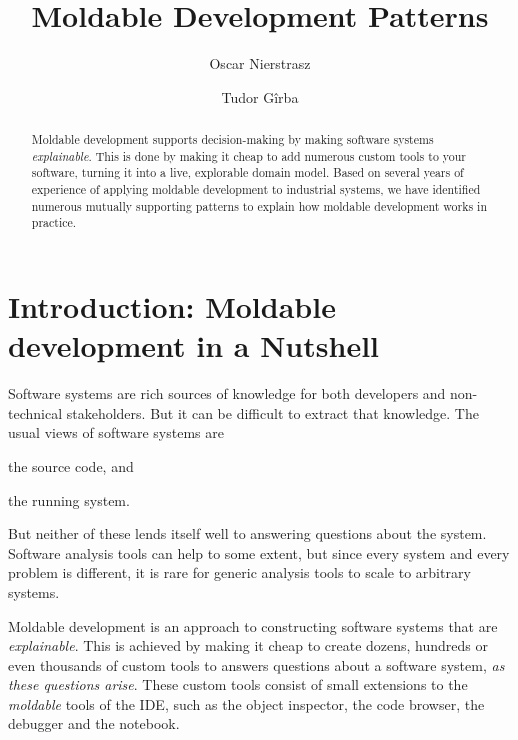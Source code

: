 \documentclass[sigconf]{acmart}
\begin{document}
\title{Moldable Development Patterns}

\author{Oscar Nierstrasz}

\author{Tudor G\^irba}

\renewcommand{\shortauthors}{Nierstrasz and G\^irba} %

\begin{abstract}
Moldable development supports decision-making by making software systems \emph{explainable}.
This is done by making it cheap to add numerous custom tools to your software, turning it into a live, explorable domain model.
Based on several years of experience of applying moldable development to industrial systems, we have identified numerous mutually supporting patterns to explain how moldable development works in practice.
\end{abstract}


\maketitle

\section{Introduction: Moldable development in a Nutshell}

Software systems are rich sources of knowledge for both developers and non-technical stakeholders.
But it can be difficult to extract that knowledge.
The usual views of software systems are
\begin{inparaenum}[(i)]
\item the source code, and
\item the running system.
\end{inparaenum}
But neither of these lends itself well to answering questions about the system.
Software analysis tools can help to some extent, but since every system and every problem is different, it is rare for generic analysis tools to scale to arbitrary systems.

Moldable development is an approach to constructing software systems that are \emph{explainable}.
This is achieved by making it cheap to create dozens, hundreds or even thousands of custom tools to answers questions about a software system, \emph{as these questions arise}.
These custom tools consist of small extensions to the \emph{moldable} tools of the IDE, such as the object inspector, the code browser, the debugger and the notebook.
\end{document}
